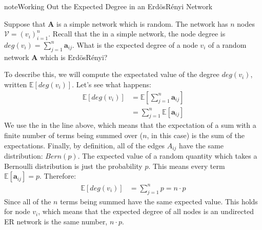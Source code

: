 \documentclass[letterpaper,10pt,english]{jupyterBook}
\begin{document}
\begin{sphinxadmonition}{note}{Working Out the Expected Degree in an Erdös\sphinxhyphen{}Rényi Network}

\sphinxAtStartPar
Suppose that \(\mathbf A\) is a simple network which is random. The network has \(n\) nodes \(\mathcal V = (v_i)_{i = 1}^n\). Recall that the in a simple network, the node degree is \(deg(v_i) = \sum_{j = 1}^n \mathbf a_{ij}\). What is the expected degree of a node \(v_i\) of a random network \(\mathbf A\) which is Erdös\sphinxhyphen{}Rényi?

\sphinxAtStartPar
To describe this, we will compute the expectated value of the degree \(deg(v_i)\), written \(\mathbb E\left[deg(v_i)\right]\). Let’s see what happens:
\begin{align*}
    \mathbb E\left[deg(v_i)\right] &= \mathbb E\left[\sum_{j = 1}^n \mathbf a_{ij}\right] \\
    &= \sum_{j = 1}^n \mathbb E[\mathbf a_{ij}]
\end{align*}
\sphinxAtStartPar
We use the  in the line above, which means that the expectation of a sum with a finite number of terms being summed over (\(n\), in this case) is the sum of the expectations. Finally, by definition, all of the edges \(A_{ij}\) have the same distribution: \(Bern(p)\). The expected value of a random quantity which takes a Bernoulli distribution is just the probability \(p\). This means every term \(\mathbb E[\mathbf a_{ij}] = p\). Therefore:
\begin{align*}
    \mathbb E\left[deg(v_i)\right] &= \sum_{j = 1}^n p = n\cdot p
\end{align*}
\sphinxAtStartPar
Since all of the \(n\) terms being summed have the same expected value. This holds for  node \(v_i\), which means that the expected degree of all nodes is an undirected ER network is the same number, \(n \cdot p\).
\end{sphinxadmonition}
\end{document}
